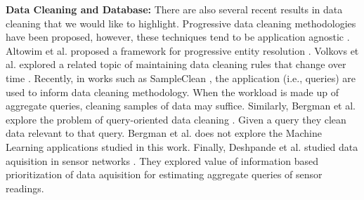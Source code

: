 \noindent \textbf{Data Cleaning and Database: } There are also several recent results in data cleaning that we would like to highlight. 
Progressive data cleaning methodologies have been proposed, however, these techniques tend to be application agnostic \cite{mayfield2010eracer}.
Altowim et al. proposed a framework for progressive entity resolution \cite{altowim2014progressive}. 
Volkovs et al. explored a related topic of maintaining data cleaning rules that change over time \cite{volkovs2014continuous}. 
Recently, in works such as SampleClean \cite{wang1999sample}, the application (i.e., queries) are used to inform data cleaning methodology.
When the workload is made up of aggregate queries, cleaning samples of data may suffice. 
Similarly, Bergman et al. explore the problem of query-oriented data cleaning \cite{bergman2015query}. Given a query they clean data relevant to that query. 
Bergman et al. does not explore the Machine Learning applications studied in this work.
Finally, Deshpande et al. studied data aquisition in sensor networks \cite{deshpande2004model}. They explored value of information based prioritization of data aquisition for estimating aggregate queries of sensor readings.



